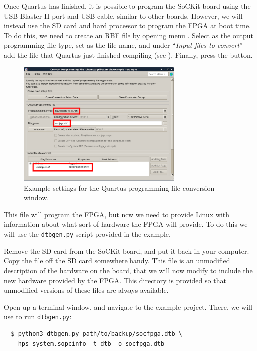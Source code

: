 \documentclass{sockitguide}
\begin{document}
Once Quartus has finished, it is possible to program the SoCKit board
using the USB-Blaster II port and USB cable, similar to other
boards. However, we will instead use the SD card and hard processor to
program the FPGA at boot time. To do this, we need to create an RBF
file by opening menu . Select  as the output
programming file type, set  as the file name,
and under ``\textit{Input files to convert}'' add the
 file that Quartus just finished compiling (see
). Finally, press the  button.

\begin{figure}
  \includegraphics[width=8cm]{figures/rbf.png}
  \caption{Example settings for the Quartus programming file conversion window.}
  \label{fig:rbf}
\end{figure}

This file will program the FPGA, but now we need to provide Linux with
information about what sort of hardware the FPGA will provide. To do
this we will use the \texttt{dtbgen.py} script provided in the
example.

Remove the SD card from the SoCKit board, and put it back in your
computer. Copy the  file off the SD card
somewhere handy. This file is an unmodified description of the
hardware on the board, that we will now modify to include the new
hardware provided by the FPGA. This  directory is
provided so that unmodified versions of these files are always
available.

Open up a terminal window, and navigate to the example project. There,
we will use  to run
\texttt{dtbgen.py}:
\begin{verbatim}
  $ python3 dtbgen.py path/to/backup/socfpga.dtb \
    hps_system.sopcinfo -t dtb -o socfpga.dtb
\end{verbatim}
\end{document}
